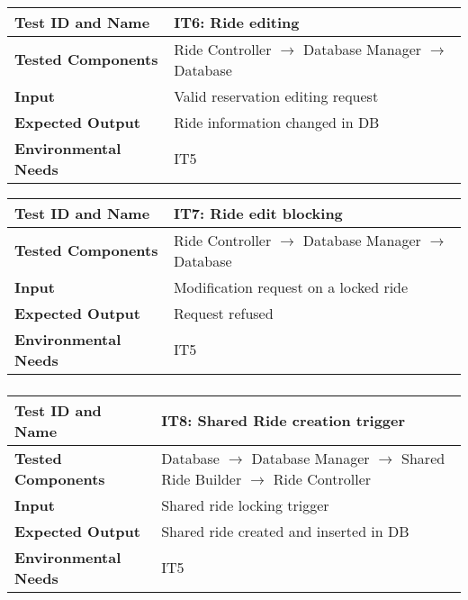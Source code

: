\subsubsection{}

\begin{tabular}{l p{}}
    \hline
    \textbf{Test ID and Name} & \textbf{IT6: Ride editing}\\
    \hline
    \textbf{Tested Components} & Ride Controller $\rightarrow$ Database Manager $\rightarrow$ Database\\
    \hline
    \textbf{Input} & Valid reservation editing request\\
    \hline
    \textbf{Expected Output} & Ride information changed in DB\\
    \hline
    \textbf{Environmental Needs} & IT5\\
    \hline
\end{tabular}

\vspace{2em}

\noindent\begin{tabular}{l p{}}
    \hline
    \textbf{Test ID and Name} & \textbf{IT7: Ride edit blocking}\\
    \hline
    \textbf{Tested Components} & Ride Controller $\rightarrow$ Database Manager $\rightarrow$ Database\\
    \hline
    \textbf{Input} & Modification request on a locked ride\\
    \hline
    \textbf{Expected Output} & Request refused\\
    \hline
    \textbf{Environmental Needs} & IT5\\
    \hline
\end{tabular}

\subsubsection{}

\begin{tabular}{l p{}}
    \hline
    \textbf{Test ID and Name} & \textbf{IT8: Shared Ride creation trigger}\\
    \hline
    \textbf{Tested Components} & Database $\rightarrow$ Database Manager $\rightarrow$ Shared Ride Builder $\rightarrow$ Ride Controller\\
    \hline
    \textbf{Input} & Shared ride locking trigger\\
    \hline
    \textbf{Expected Output} & Shared ride created and inserted in DB\\
    \hline
    \textbf{Environmental Needs} & IT5\\
    \hline
\end{tabular}

